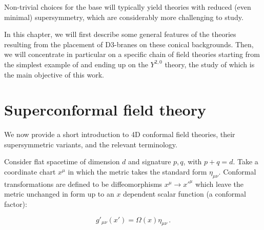 Non-trivial choices for the base will typically yield theories with reduced (even minimal) supersymmetry, which are considerably more challenging to study.

In this chapter, we will first describe some general features of the theories resulting from the placement of D3-branes on these conical backgrounds. Then, we will concentrate in particular on a specific chain of field theories starting from the simplest example of \SYM and ending up on the $Y^{2,0}$ theory, the study of which is the main objective of this work.

\section{Superconformal field theory}\label{sec:scft}

We now provide a short introduction to 4D conformal field theories, their supersymmetric variants, and the relevant terminology.

%
%
%

Consider flat spacetime of dimension $d$ and signature $p,q$, with $p+q = d$. Take a coordinate chart $x^\mu$ in which the metric takes the standard form $\eta_{\mu\nu}$. Conformal transformations are defined to be diffeomorphisms $x^\mu \rightarrow x'^\mu$ which leave the metric unchanged in form up to an $x$ dependent scalar function (a conformal factor):

\begin{equation}
	g'_{\mu\nu}(x') = \Omega(x) \eta_{\mu\nu}\,.
	\label{}
\end{equation}


